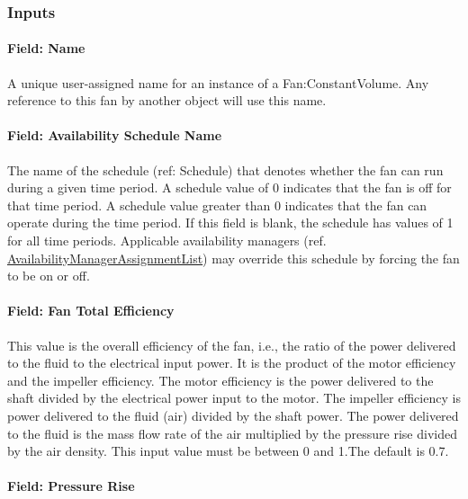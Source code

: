 \subsubsection{Inputs}\label{inputs-019}

\paragraph{Field: Name}\label{field-name-018}

A unique user-assigned name for an instance of a Fan:ConstantVolume. Any reference to this fan by another object will use this name.

\paragraph{Field: Availability Schedule Name}\label{field-availability-schedule-name-007}

The name of the schedule (ref: Schedule) that denotes whether the fan can run during a given time period. A schedule value of 0 indicates that the fan is off for that time period. A schedule value greater than 0 indicates that the fan can operate during the time period. If this field is blank, the schedule has values of 1 for all time periods. Applicable availability managers (ref. \hyperref[availabilitymanagerassignmentlist]{AvailabilityManagerAssignmentList}) may override this schedule by forcing the fan to be on or off.

\paragraph{Field: Fan Total Efficiency}\label{field-fan-total-efficiency-000}

This value is the overall efficiency of the fan, i.e., the ratio of the power delivered to the fluid to the electrical input power. It is the product of the motor efficiency and the impeller efficiency. The motor efficiency is the power delivered to the shaft divided by the electrical power input to the motor. The impeller efficiency is power delivered to the fluid (air) divided by the shaft power. The power delivered to the fluid is the mass flow rate of the air multiplied by the pressure rise divided by the air density. This input value must be between 0 and 1.The default is 0.7.

\paragraph{Field: Pressure Rise}\label{field-pressure-rise}

